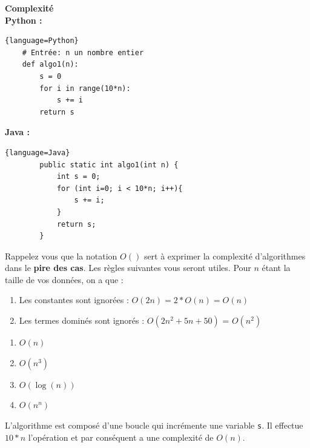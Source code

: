 \begin{Exercice}[10 minutes] \textbf{Complexité} \\
    \textbf{Python :}
    \begin{lstlisting}{language=Python}
    # Entrée: n un nombre entier
    def algo1(n):
        s = 0
        for i in range(10*n):
            s += i
        return s
    \end{lstlisting}
    
    \textbf{Java :}
    \begin{lstlisting}{language=Java}
        public static int algo1(int n) {
            int s = 0;
            for (int i=0; i < 10*n; i++){
                s += i;
            }
            return s;
        }
    \end{lstlisting}
    
    \begin{conseil}
    Rappelez vous que la notation $O()$ sert à exprimer la complexité d'algorithmes dans le \textbf{pire des cas}. Les règles suivantes vous seront utiles. Pour $n$ étant la taille de vos données, on a que :
    \begin{enumerate}
        \item Les constantes sont ignorées : $O(2n) = 2*O(n) = O(n)$ 
        \item Les termes dominés sont ignorés : $O(2n^2+5n+50)$ = $O(n^2)$
    \end{enumerate}
    \end{conseil}

    \begin{enumerate}
        \item $O(n)$
        \item $O(n^3)$
        \item $O(\log(n))$
        \item $O(n^n)$
    \end{enumerate}

    \begin{solution}
        L'algorithme est composé d'une boucle qui incrémente une variable \lstinline{s}. Il effectue $10*n$ l'opération et par conséquent a une complexité de $O(n)$.
    \end{solution}
\end{Exercice}

